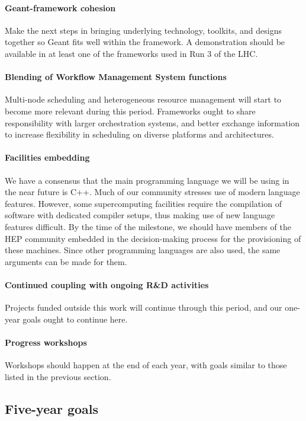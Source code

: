 \documentclass[12pt,a4paper]{article}
\begin{document}
\paragraph{Geant-framework cohesion} Make the next steps in bringing
underlying technology, toolkits, and designs together so Geant fits
well within the framework. A demonstration should be available in at
least one of the frameworks used in Run 3 of the LHC.

\paragraph{Blending of Workflow Management System functions}
Multi-node scheduling and heterogeneous resource management will start
to become more relevant during this period. Frameworks ought to share
responsibility with larger orchestration systems, and better exchange
information to increase flexibility in scheduling on diverse platforms
and architectures.

\paragraph{Facilities embedding} We have a consensus that the main
programming language we will be using in the near future is C++.  Much
of our community stresses use of modern language features. However,
some supercomputing facilities require the compilation of software
with dedicated compiler setups, thus making use of new language
features difficult. By the time of the milestone, we should have
members of the HEP community embedded in the decision-making process
for the provisioning of these machines. Since other programming
languages are also used, the same arguments can be made for them.

\paragraph{Continued coupling with ongoing R\&D activities} Projects
funded outside this work will continue through this period, and our
one-year goals ought to continue here.

\paragraph{Progress workshops} Workshops should happen at the end of
each year, with goals similar to those listed in the previous section.

\subsection{Five-year goals}
\label{sec:five-year-goals}
\end{document}
